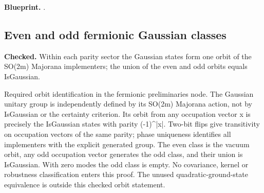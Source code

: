 
\textbf{Blueprint.} .

\subsection{Even and odd fermionic Gaussian classes}\label{paper:fermion-gaussian}
\textbf{Checked.} Within each parity sector the Gaussian states form one orbit of the SO(2m) Majorana implementers; the union of the even and odd orbits equals IsGaussian. 

Required orbit identification in the fermionic preliminaries node. The Gaussian unitary group is independently defined by its SO(2m) Majorana action, not by IsGaussian or the certainty criterion. Its orbit from any occupation vector x is precisely the IsGaussian states with parity (-1)\textasciicircum{}|x|. Two-bit flips give transitivity on occupation vectors of the same parity; phase uniqueness identifies all implementers with the explicit generated group. The even class is the vacuum orbit, any odd occupation vector generates the odd class, and their union is IsGaussian. With zero modes the odd class is empty. No covariance, kernel or robustness classification enters this proof. The unused quadratic-ground-state equivalence is outside this checked orbit statement.

